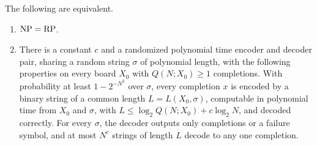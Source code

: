 \begin{theorem}
\label{thm:coding}
The following are equivalent.
\begin{enumerate}
\item $\mathrm{NP} = \mathrm{RP}$.
\item There is a constant $c$ and a randomized polynomial time encoder and decoder pair, sharing a random string $\sigma$ of polynomial length, with the following properties on every board $X_0$ with $Q(N; X_0) \ge 1$ completions. With probability at least $1 - 2^{-N^2}$ over $\sigma$, every completion $x$ is encoded by a binary string of a common length $L = L(X_0, \sigma)$, computable in polynomial time from $X_0$ and $\sigma$, with $L \le \log_2 Q(N; X_0) + c \log_2 N$, and decoded correctly. For every $\sigma$, the decoder outputs only completions or a failure symbol, and at most $N^c$ strings of length $L$ decode to any one completion.
\end{enumerate}
\end{theorem}


